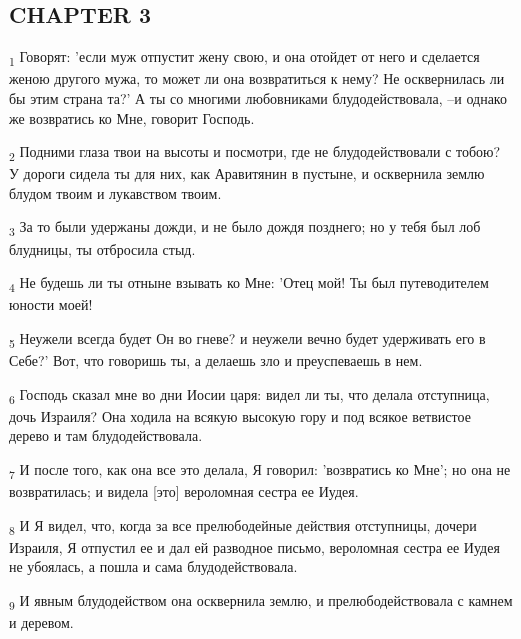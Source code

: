 \subsection{CHAPTER 3}
\begin{tcolorbox}
\textsubscript{1} Говорят: 'если муж отпустит жену свою, и она отойдет от него и сделается женою другого мужа, то может ли она возвратиться к нему? Не осквернилась ли бы этим страна та?' А ты со многими любовниками блудодействовала, --и однако же возвратись ко Мне, говорит Господь.
\end{tcolorbox}
\begin{tcolorbox}
\textsubscript{2} Подними глаза твои на высоты и посмотри, где не блудодействовали с тобою? У дороги сидела ты для них, как Аравитянин в пустыне, и осквернила землю блудом твоим и лукавством твоим.
\end{tcolorbox}
\begin{tcolorbox}
\textsubscript{3} За то были удержаны дожди, и не было дождя позднего; но у тебя был лоб блудницы, ты отбросила стыд.
\end{tcolorbox}
\begin{tcolorbox}
\textsubscript{4} Не будешь ли ты отныне взывать ко Мне: 'Отец мой! Ты был путеводителем юности моей!
\end{tcolorbox}
\begin{tcolorbox}
\textsubscript{5} Неужели всегда будет Он во гневе? и неужели вечно будет удерживать его в Себе?' Вот, что говоришь ты, а делаешь зло и преуспеваешь в нем.
\end{tcolorbox}
\begin{tcolorbox}
\textsubscript{6} Господь сказал мне во дни Иосии царя: видел ли ты, что делала отступница, дочь Израиля? Она ходила на всякую высокую гору и под всякое ветвистое дерево и там блудодействовала.
\end{tcolorbox}
\begin{tcolorbox}
\textsubscript{7} И после того, как она все это делала, Я говорил: 'возвратись ко Мне'; но она не возвратилась; и видела [это] вероломная сестра ее Иудея.
\end{tcolorbox}
\begin{tcolorbox}
\textsubscript{8} И Я видел, что, когда за все прелюбодейные действия отступницы, дочери Израиля, Я отпустил ее и дал ей разводное письмо, вероломная сестра ее Иудея не убоялась, а пошла и сама блудодействовала.
\end{tcolorbox}
\begin{tcolorbox}
\textsubscript{9} И явным блудодейством она осквернила землю, и прелюбодействовала с камнем и деревом.
\end{tcolorbox}
